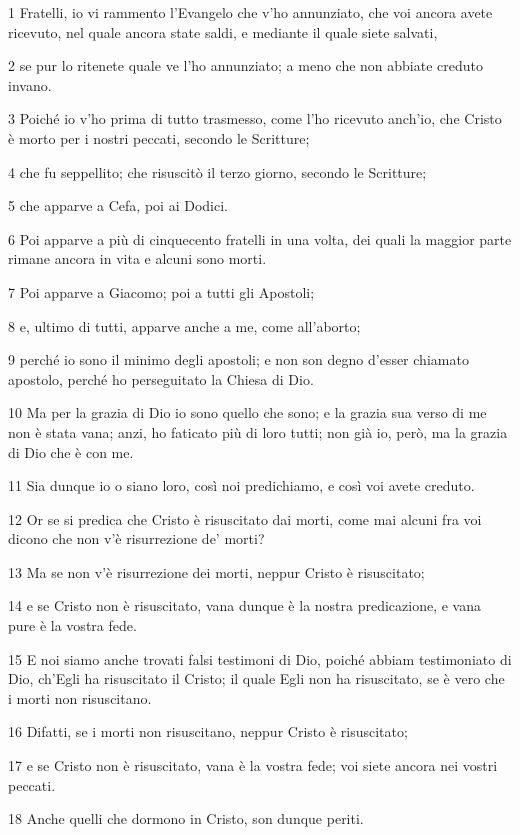 \par 1 Fratelli, io vi rammento l'Evangelo che v'ho annunziato, che voi ancora avete ricevuto, nel quale ancora state saldi, e mediante il quale siete salvati,
\par 2 se pur lo ritenete quale ve l'ho annunziato; a meno che non abbiate creduto invano.
\par 3 Poiché io v'ho prima di tutto trasmesso, come l'ho ricevuto anch'io, che Cristo è morto per i nostri peccati, secondo le Scritture;
\par 4 che fu seppellito; che risuscitò il terzo giorno, secondo le Scritture;
\par 5 che apparve a Cefa, poi ai Dodici.
\par 6 Poi apparve a più di cinquecento fratelli in una volta, dei quali la maggior parte rimane ancora in vita e alcuni sono morti.
\par 7 Poi apparve a Giacomo; poi a tutti gli Apostoli;
\par 8 e, ultimo di tutti, apparve anche a me, come all'aborto;
\par 9 perché io sono il minimo degli apostoli; e non son degno d'esser chiamato apostolo, perché ho perseguitato la Chiesa di Dio.
\par 10 Ma per la grazia di Dio io sono quello che sono; e la grazia sua verso di me non è stata vana; anzi, ho faticato più di loro tutti; non già io, però, ma la grazia di Dio che è con me.
\par 11 Sia dunque io o siano loro, così noi predichiamo, e così voi avete creduto.
\par 12 Or se si predica che Cristo è risuscitato dai morti, come mai alcuni fra voi dicono che non v'è risurrezione de' morti?
\par 13 Ma se non v'è risurrezione dei morti, neppur Cristo è risuscitato;
\par 14 e se Cristo non è risuscitato, vana dunque è la nostra predicazione, e vana pure è la vostra fede.
\par 15 E noi siamo anche trovati falsi testimoni di Dio, poiché abbiam testimoniato di Dio, ch'Egli ha risuscitato il Cristo; il quale Egli non ha risuscitato, se è vero che i morti non risuscitano.
\par 16 Difatti, se i morti non risuscitano, neppur Cristo è risuscitato;
\par 17 e se Cristo non è risuscitato, vana è la vostra fede; voi siete ancora nei vostri peccati.
\par 18 Anche quelli che dormono in Cristo, son dunque periti.
